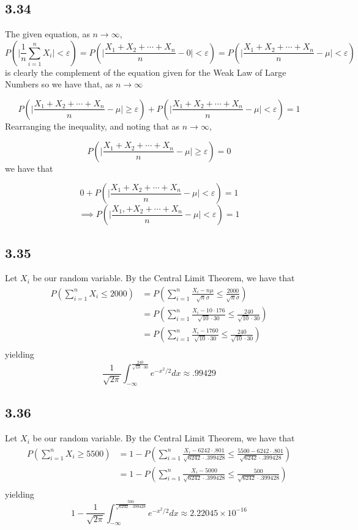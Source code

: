 \documentclass[letterpaper,12pt]{article}
\theoremstyle{definition}
\begin{document}
\subsection*{3.34}
The given equation, as $n \to \infty$,
\[P \left( \Big| \frac{1}{n} \sum^{n}_{i=1} X_i \Big| < \varepsilon \right) = 
P \left( \Big| \frac{X_1 + X_2 +\cdots+ X_n}{n} - 0 \Big| < \varepsilon\right) = 
P \left( \Big| \frac{X_1 + X_2 +\cdots+ X_n}{n} - \mu \Big| < \varepsilon\right)\]
is clearly the complement of the equation given for the Weak Law of Large Numbers so we have that, as $n \to \infty$

\[P \left( \Big| \frac{X_1 + X_2 +\cdots+ X_n}{n} - \mu \Big| \geq \varepsilon\right) + 
P \left( \Big| \frac{X_1 + X_2 +\cdots+ X_n}{n} - \mu \Big| < \varepsilon\right) = 1\]
Rearranging the inequality, and noting that as $n \to \infty$,

\[P \left( \Big| \frac{X_1 + X_2 +\cdots+ X_n}{n} - \mu \Big| \geq \varepsilon\right) = 0\] 
we have that


\[0 + 
P \left( \Big| \frac{X_1 + X_2 +\cdots+ X_n}{n} - \mu \Big| < \varepsilon\right) = 1\]
\[\implies P \left( \Big| \frac{X_1, + X_2 +\cdots+ X_n}{n} - \mu \Big| < \varepsilon\right) = 1\]

\subsection*{3.35}
Let $X_i$ be our random variable. By the Central Limit Theorem, we have that
\begin{align*}
    P( \sum^{n}_{i=1} X_i \leq 2000) &= P( \sum^{n}_{i=1}\frac{ X_i - n\mu }{\sqrt{n} \sigma}\leq \frac{ 2000 }{\sqrt{n} \sigma}) \\
    &= P( \sum^{n}_{i=1}\frac{ X_i - 10\cdot176 }{\sqrt{10} \cdot 30}\leq \frac{240}{\sqrt{10} \cdot 30}) \\
    &= P( \sum^{n}_{i=1}\frac{ X_i - 1760 }{\sqrt{10} \cdot 30}\leq \frac{240}{\sqrt{10} \cdot 30}) \\
\end{align*}
yielding
\[\frac{1}{\sqrt{2 \pi}} \int_{-\infty}^{\frac{240}{\sqrt{10}\cdot 30}} e^{-x^2/2} dx \approx .99429\]


\subsection*{3.36}

Let $X_i$ be our random variable. By the Central Limit Theorem, we have that
\begin{align*}
    P( \sum^{n}_{i=1} X_i \geq 5500) &= 1 - P( \sum^{n}_{i=1}\frac{ X_i - 6242\cdot.801 }{\sqrt{6242} \cdot.399428}\leq \frac{5500- 6242\cdot.801 }{\sqrt{6242}\cdot .399428}) \\
    &=1 -  P( \sum^{n}_{i=1}\frac{ X_i - 5000 }{\sqrt{6242}\cdot .399428}\leq \frac{500}{\sqrt{6242} \cdot.399428}) \\
\end{align*}
yielding
\[1 - \frac{1}{\sqrt{2 \pi}} \int_{-\infty}^{\frac{500}{\sqrt{6242}\cdot .399428}} e^{-x^2/2} dx \approx 2.22045\times10^{-16}\]
\end{document}
